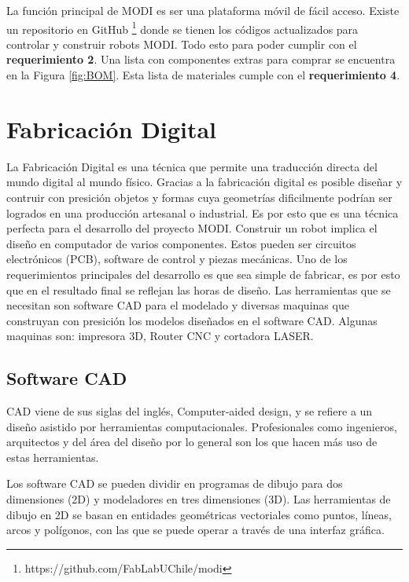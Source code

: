 La función principal de MODI es ser una plataforma móvil de fácil acceso. Existe un repositorio en GitHub  \footnote{https://github.com/FabLabUChile/modi} donde se tienen los códigos actualizados para controlar y construir robots MODI. Todo esto para poder cumplir con el \textbf{requerimiento 2}. Una lista con componentes extras para comprar se encuentra en la Figura \ref{fig:BOM}. Esta lista de materiales cumple con el \textbf{requerimiento 4}.


\section{Fabricación Digital}

La Fabricación Digital es una técnica que permite una traducción directa del mundo digital al mundo físico. Gracias a la fabricación digital es posible diseñar y contruir con presición objetos y formas cuya geometrías dificilmente podrían ser logrados en una producción artesanal o industrial. Es por esto que es una técnica perfecta para el desarrollo del proyecto MODI. Construir un robot implica el diseño en computador de varios componentes. Estos pueden ser circuitos electrónicos (PCB), software de control y piezas mecánicas. Uno de los requerimientos principales del desarrollo es que sea simple de fabricar, es por esto que en el resultado final se reflejan las horas de diseño. Las herramientas que se necesitan son software CAD para el modelado y diversas maquinas que construyan con presición los modelos diseñados en el software CAD. Algunas maquinas son: impresora 3D, Router CNC y cortadora LASER.




\subsection{Software CAD}

CAD viene de sus siglas del inglés, Computer-aided design, y se refiere a un diseño asistido por herramientas computacionales. Profesionales como ingenieros, arquitectos y del área del diseño por lo general son los que hacen más uso de estas herramientas.

Los software CAD se pueden dividir en programas de dibujo para dos dimensiones (2D) y modeladores en tres dimensiones (3D). Las herramientas de dibujo en 2D se basan en entidades geométricas vectoriales como puntos, líneas, arcos y polígonos, con las que se puede operar a través de una interfaz gráfica.

